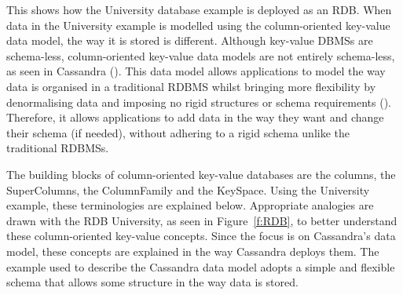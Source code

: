 This shows how the University database example is deployed as an
\ac{RDB}. When data in the University example is modelled using the
column-oriented key-value data model, the way it is stored is different.
Although key-value \acp{DBMS} are schema-less, column-oriented key-value data
models are not entirely schema-less, as seen in Cassandra (). This data model allows applications to model the way data is
organised in a traditional RDBMS whilst bringing more flexibility by
denormalising data and imposing no rigid structures or schema requirements
(). Therefore, it allows applications to add data in the
way they want and change their schema (if needed), without adhering to a
rigid schema unlike the traditional \acp{RDBMS}.

The building blocks of column-oriented key-value databases are the columns,
the SuperColumns, the ColumnFamily and the KeySpace. Using the
University example, these terminologies are explained below.
Appropriate analogies are drawn with the \ac{RDB} University, as
seen in Figure~\ref{f:RDB}, to better understand these column-oriented key-value
concepts. Since the focus is on Cassandra's data model, these concepts
are explained in the way Cassandra deploys them. The example used
to describe the Cassandra data model adopts a simple and flexible schema that
allows some structure in the way data is stored.

